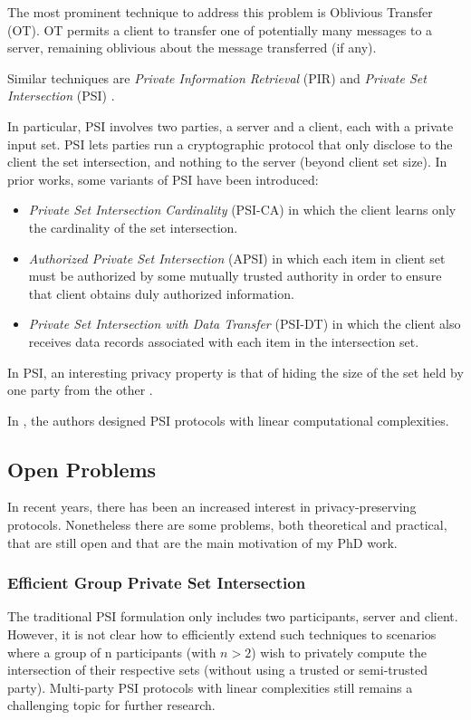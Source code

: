 \documentclass[dvips,12pt]{article}
\begin{document}
The most prominent technique to address this problem is Oblivious Transfer (OT)\cite{oblivious}.
OT permits a client to transfer one of potentially many messages to a server, remaining oblivious about the message transferred (if any).

Similar techniques are \emph{Private Information Retrieval} (PIR) \cite{pir} and \emph{Private Set Intersection} (PSI) \cite{psi}. 

In particular, PSI involves two parties, a server and a client, each with a private input set. PSI
lets parties run a cryptographic protocol that only disclose to the client the set intersection, and
nothing to the server (beyond client set size).
In prior works, some variants of PSI have been introduced:
\begin{itemize}
\item \emph{Private Set Intersection Cardinality} (PSI-CA) in which the client learns only the cardinality of the set intersection.
\item \emph{Authorized Private Set Intersection} (APSI) in which each item in client set must be authorized by some mutually trusted authority in order to ensure that client obtains duly authorized information.
\item \emph{Private Set Intersection with Data Transfer} (PSI-DT) in which the client also receives data records associated with each item in the intersection set.
\end{itemize}

In PSI, an interesting privacy property is that of hiding the size of the set held by one party from the other \cite{size-psi}.

In \cite{lin-psi,linear-psi}, the authors designed PSI protocols with linear computational complexities.

\subsection{Open Problems}
In recent years, there has been an increased interest in privacy-preserving protocols. 
Nonetheless there are some problems, both theoretical and practical, that are still open and that are the main motivation of my PhD work.
\subsubsection{Efficient Group Private Set Intersection}
The traditional PSI formulation only includes two participants, server and client. However, it is not clear how to efficiently extend such techniques to scenarios where a group of n participants (with $n > 2$) wish to privately compute the intersection of their respective sets (without using a trusted or semi-trusted party). Multi-party PSI protocols with linear complexities still remains a challenging topic for further research.
\end{document}
